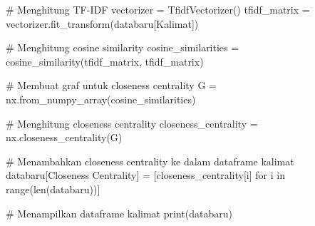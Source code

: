 \documentclass[
  letterpaper,
]{krantz}
\makeatletter
\newenvironment{Shaded}{\begin{snugshade}}{\end{snugshade}}
\newcommand{\BuiltInTok}[1]{\textcolor[rgb]{0.00,0.23,0.31}{#1}}
\newcommand{\CommentTok}[1]{\textcolor[rgb]{0.37,0.37,0.37}{#1}}
\newcommand{\ControlFlowTok}[1]{\textcolor[rgb]{0.00,0.23,0.31}{#1}}
\newcommand{\KeywordTok}[1]{\textcolor[rgb]{0.00,0.23,0.31}{#1}}
\newcommand{\NormalTok}[1]{\textcolor[rgb]{0.00,0.23,0.31}{#1}}
\newcommand{\OperatorTok}[1]{\textcolor[rgb]{0.37,0.37,0.37}{#1}}
\newcommand{\StringTok}[1]{\textcolor[rgb]{0.13,0.47,0.30}{#1}}
\newenvironment{kframe}{%
\medskip{}
\setlength{\fboxsep}{.8em}
 \def\at@end@of@kframe{}%
 \ifinner\ifhmode%
  \def\at@end@of@kframe{\end{minipage}}%
  \begin{minipage}{\columnwidth}%
 \fi\fi%
 \def\FrameCommand##1{\hskip\@totalleftmargin \hskip-\fboxsep
 \colorbox{shadecolor}{##1}\hskip-\fboxsep
     \hskip-\linewidth \hskip-\@totalleftmargin \hskip\columnwidth}%
 \MakeFramed {\advance\hsize-\width
   \@totalleftmargin\z@ \linewidth\hsize
   \@setminipage}}%
 {\par\unskip\endMakeFramed%
 \at@end@of@kframe}
\renewenvironment{Shaded}{\begin{kframe}}{\end{kframe}}
\makeatother
\begin{document}
\begin{Shaded}
\begin{Highlighting}[]
\CommentTok{\# Menghitung TF{-}IDF}
\NormalTok{vectorizer }\OperatorTok{=}\NormalTok{ TfidfVectorizer()}
\NormalTok{tfidf\_matrix }\OperatorTok{=}\NormalTok{ vectorizer.fit\_transform(databaru[}\StringTok{\textquotesingle{}Kalimat\textquotesingle{}}\NormalTok{])}
\end{Highlighting}
\end{Shaded}

\begin{Shaded}
\begin{Highlighting}[]
\CommentTok{\# Menghitung cosine similarity}
\NormalTok{cosine\_similarities }\OperatorTok{=}\NormalTok{ cosine\_similarity(tfidf\_matrix, tfidf\_matrix)}
\end{Highlighting}
\end{Shaded}

\begin{Shaded}
\begin{Highlighting}[]
\CommentTok{\# Membuat graf untuk closeness centrality}
\NormalTok{G }\OperatorTok{=}\NormalTok{ nx.from\_numpy\_array(cosine\_similarities)}

\CommentTok{\# Menghitung closeness centrality}
\NormalTok{closeness\_centrality }\OperatorTok{=}\NormalTok{ nx.closeness\_centrality(G)}

\CommentTok{\# Menambahkan closeness centrality ke dalam dataframe kalimat}
\NormalTok{databaru[}\StringTok{\textquotesingle{}Closeness Centrality\textquotesingle{}}\NormalTok{] }\OperatorTok{=}\NormalTok{ [closeness\_centrality[i] }\ControlFlowTok{for}\NormalTok{ i }\KeywordTok{in} \BuiltInTok{range}\NormalTok{(}\BuiltInTok{len}\NormalTok{(databaru))]}

\CommentTok{\# Menampilkan dataframe kalimat}
\BuiltInTok{print}\NormalTok{(databaru)}
\end{Highlighting}
\end{Shaded}
\end{document}
